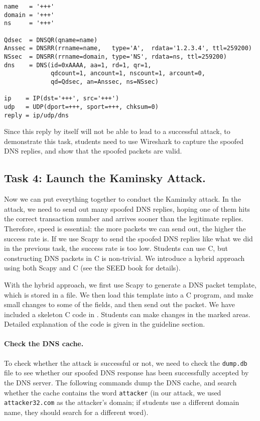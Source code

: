 \begin{lstlisting}
name   = '+++'  
domain = '+++'  
ns     = '+++'

Qdsec  = DNSQR(qname=name)
Anssec = DNSRR(rrname=name,   type='A',  rdata='1.2.3.4', ttl=259200)
NSsec  = DNSRR(rrname=domain, type='NS', rdata=ns, ttl=259200)
dns    = DNS(id=0xAAAA, aa=1, rd=1, qr=1,
             qdcount=1, ancount=1, nscount=1, arcount=0,
             qd=Qdsec, an=Anssec, ns=NSsec)

ip    = IP(dst='+++', src='+++')
udp   = UDP(dport=+++, sport=+++, chksum=0)
reply = ip/udp/dns
\end{lstlisting}
 

Since this reply by itself will not be able to lead to a successful 
attack, to demonstrate this task, students need to 
use Wireshark to capture the spoofed DNS replies, and 
show that the spoofed packets are valid. 


\subsection{Task 4: Launch the Kaminsky Attack.}   

Now we can put everything together to conduct the Kaminsky attack. 
In the attack, we need to send out many spoofed DNS replies, hoping 
one of them hits the correct transaction number and arrives sooner
than the legitimate replies. Therefore, speed is essential: the more packets 
we can send out, the higher the success rate is. If we use 
Scapy to send the spoofed DNS replies like what we did in the 
previous task, the success rate is too low. Students can use 
C, but constructing DNS packets in C is non-trivial. 
We introduce a hybrid approach using both Scapy and C (see the SEED
book for details). 


With the hybrid approach, we first use Scapy to generate 
a DNS packet template, which is stored in a file. 
We then load this template into a C program, and make 
small changes to some of the fields, and then send 
out the packet. 
We have included a skeleton C code
in . 
Students can make changes
in the marked areas. Detailed explanation
of the code is given in the 
guideline section.


\paragraph{Check the DNS cache.}
To check whether the attack is successful or not, we need to 
check the {\tt dump.db} file to see whether our spoofed DNS
response has been successfully accepted by the DNS server. 
The following commands dump the DNS cache, and search whether
the cache contains the word \texttt{attacker} (in our 
attack, we used \texttt{attacker32.com} as the attacker's 
domain; if students use a different domain name, they should 
search for a different word).  

